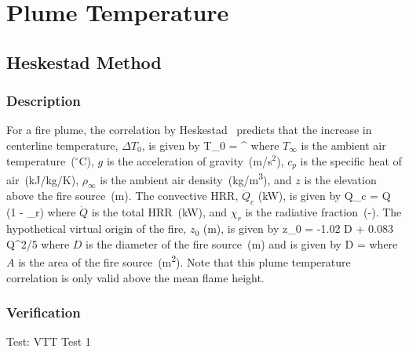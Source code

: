 
\chapter{Plume Temperature}
\label{Plume_Chapter}

\section{Heskestad Method}

\subsection*{Description}

For a fire plume, the correlation by Heskestad~\cite{SFPE:Heskestad} predicts that the increase in centerline temperature, $\Delta T_0$, is given by
\be
\Delta T_0 =  \quad ^
\label{eq:Heskestad}
\ee
where $T_\infty$ is the ambient air temperature~($^\circ$C), $g$ is the acceleration of gravity~(m/s$^2$), $c_p$ is the specific heat of air~(kJ/kg/K), $\rho_{\infty}$ is the ambient air density~(\si{kg/m^3}), and $z$ is the elevation above the fire source~(\si{m}). The convective HRR, $\dot Q_c$ (\si{kW}), is given by
\be
\dot Q_c = \dot Q (1 - \chi_r)
\label{eq:Heskestad_Qc}
\ee
where $\dot Q$ is the total HRR~(\si{kW}), and $\chi_r$ is the radiative fraction~(-). The hypothetical virtual origin of the fire, $z_0$ (\si{m}), is given by
\be
z_0 = -1.02 D + 0.083 \dot Q^{2/5}
\label{eq:Heskestad_z0}
\ee
where $D$ is the diameter of the fire source~(\si{m}) and is given by
\be
D = 
\label{eq:Heskestad_D}
\ee
where $A$ is the area of the fire source~(\si{m^2}).
Note that this plume temperature correlation is only valid above the mean flame height.


\clearpage


\subsection*{Verification}

Test: VTT Test 1

